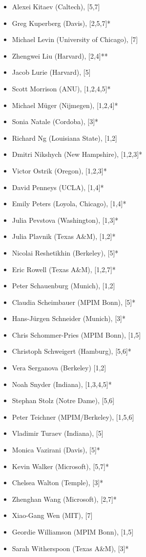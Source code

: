 \documentclass[12pt]{article}
\begin{document}
\begin{multicols}{2}
\begin{itemize}
\item Alexei Kitaev (Caltech), [5,7]
\item Greg Kuperberg (Davis), [2,5,7]*
\item Michael Levin (University of Chicago), [7]
\item Zhengwei Liu (Harvard), [2,4]**
\item Jacob Lurie (Harvard), [5]
\item Scott Morrison (ANU), [1,2,4,5]*
\item Michael M\"uger (Nijmegen), [1,2,4]*
\item Sonia Natale (Cordoba), [3]*
\item Richard Ng (Louisiana State), [1,2]
\item Dmitri Nikshych (New Hampshire), [1,2,3]*
\item Victor Ostrik (Oregon), [1,2,3]*
\item David Penneys (UCLA), [1,4]*
\item Emily Peters (Loyola, Chicago), [1,4]*
\item Julia Pevstova (Washington), [1,3]*
\item Julia Plavnik (Texas A\&M), [1,2]*
\item Nicolai Reshetikhin (Berkeley), [5]*
\item Eric Rowell (Texas A\&M), [1,2,7]*
\item Peter Schauenburg (Munich), [1,2]
\item Claudia Scheimbauer (MPIM Bonn), [5]*
\item Hans-J\"urgen Schneider (Munich), [3]*
\item Chris Schommer-Pries (MPIM Bonn), [1,5]
\item Christoph Schweigert (Hamburg), [5,6]*
\item Vera Serganova (Berkeley) [1,2]
\item Noah Snyder (Indiana), [1,3,4,5]*
\item Stephan Stolz (Notre Dame), [5,6]
\item Peter Teichner (MPIM/Berkeley), [1,5,6]
\item Vladimir Turaev (Indiana), [5]
\item Monica Vazirani (Davis), [5]*
\item Kevin Walker (Microsoft), [5,7]*
\item Chelsea Walton (Temple), [3]*
\item Zhenghan Wang (Microsoft), [2,7]*
\item Xiao-Gang Wen (MIT), [7]
\item Geordie Williamson (MPIM Bonn), [1,5]
\item Sarah Witherspoon (Texas A\&M), [3]*
\end{itemize}
\end{multicols}
\end{document}
